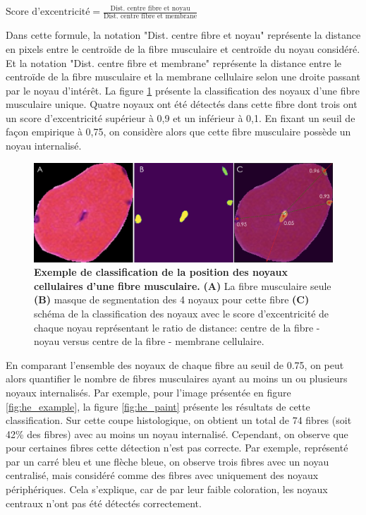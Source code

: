 \(\text{Score d'excentricité} = \frac{\text{Dist. centre fibre et noyau}}{\text{Dist. centre fibre et membrane}}\)

Dans cette formule, la notation "Dist. centre fibre et noyau" représente la distance en pixels entre le centroïde de la fibre musculaire et centroïde du noyau considéré. Et la notation "Dist. centre fibre et membrane" représente la distance entre le centroïde de la fibre musculaire et la membrane cellulaire selon une droite passant par le noyau d'intérêt. La figure \ref{fig:he_single_nuc} présente la classification des noyaux d'une fibre musculaire unique. Quatre noyaux ont été détectés dans cette fibre dont trois ont un score d'excentricité supérieur à 0,9 et un inférieur à 0,1. En fixant un seuil de façon empirique à 0,75, on considère alors que cette fibre musculaire possède un noyau internalisé.
\begin{figure}[!htbp]
 \centering
 \includegraphics[width=1\textwidth]{figures/he_single_nuc.png}
 \caption[Exemple de classification de la position des noyaux]{\textbf{Exemple de classification de la position des noyaux cellulaires d'une fibre musculaire.} \textbf{(A)} La fibre musculaire seule \textbf{(B)} masque de segmentation des 4 noyaux pour cette fibre \textbf{(C)} schéma de la classification des noyaux avec le score d'excentricité de chaque noyau représentant le ratio de distance: centre de la fibre - noyau versus centre de la fibre - membrane cellulaire.}
 \label{fig:he_single_nuc}
\end{figure}
En comparant l'ensemble des noyaux de chaque fibre au seuil de 0.75, on peut alors quantifier le nombre de fibres musculaires ayant au moins un ou plusieurs noyaux internalisés. Par exemple, pour l'image présentée en figure \ref{fig:he_example}, la figure \ref{fig:he_paint} présente les résultats de cette classification. Sur cette coupe histologique, on obtient un total de 74 fibres (soit 42\% des fibres) avec au moins un noyau internalisé. Cependant, on observe que pour certaines fibres cette détection n'est pas correcte. Par exemple, représenté par un carré bleu et une flèche bleue, on observe trois fibres avec un noyau centralisé, mais considéré comme des fibres avec uniquement des noyaux périphériques. Cela s'explique, car de par leur faible coloration, les noyaux centraux n'ont pas été détectés correctement.
